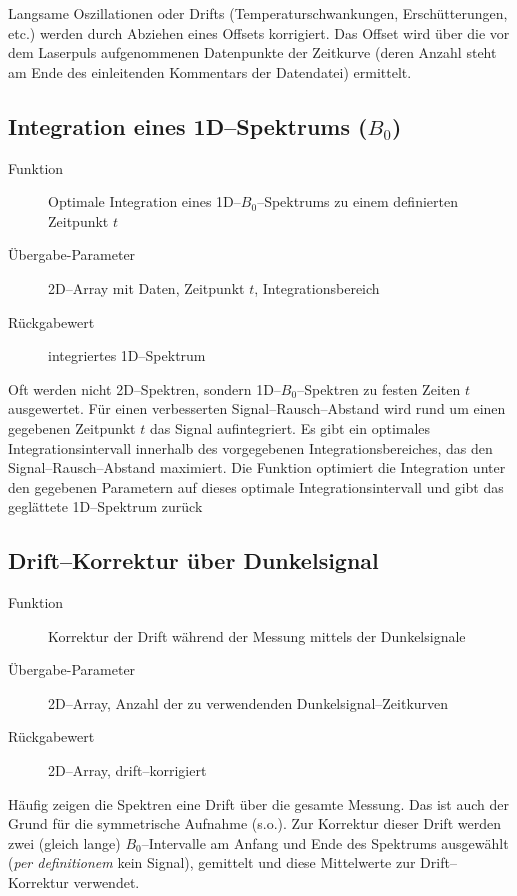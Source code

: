 \documentclass{article}
\begin{document}
Langsame Oszillationen oder Drifts (Temperaturschwankungen, Erschütterungen, etc.)
werden durch Abziehen eines Offsets korrigiert. Das Offset wird über die vor dem
Laserpuls aufgenommenen Datenpunkte der Zeitkurve (deren Anzahl steht am Ende
des einleitenden Kommentars der Datendatei) ermittelt.


\subsection{Integration eines 1D--Spektrums ($B_0$)}

\begin{description}
  \item[Funktion] Optimale Integration eines 1D--$B_0$--Spektrums zu einem
  definierten Zeitpunkt $t$
  \item[Übergabe-Parameter] 2D--Array mit Daten, Zeitpunkt $t$, Integrationsbereich
  \item[Rückgabewert] integriertes 1D--Spektrum
\end{description}

Oft werden nicht 2D--Spektren, sondern 1D--$B_0$--Spektren zu festen Zeiten $t$ 
ausgewertet. Für einen verbesserten Signal--Rausch--Abstand wird rund um einen 
gegebenen Zeitpunkt $t$ das Signal aufintegriert. Es gibt ein optimales 
Integrationsintervall innerhalb des vorgegebenen Integrationsbereiches, das den 
Signal--Rausch--Abstand maximiert. Die Funktion optimiert die Integration unter 
den gegebenen Parametern auf dieses optimale Integrationsintervall und gibt das 
geglättete 1D--Spektrum zurück


\subsection{Drift--Korrektur über Dunkelsignal}

\begin{description}
  \item[Funktion] Korrektur der Drift während der Messung mittels der Dunkelsignale
  \item[Übergabe-Parameter] 2D--Array, Anzahl der zu verwendenden 
  Dunkelsignal--Zeitkurven
  \item[Rückgabewert] 2D--Array, drift--korrigiert
\end{description}

Häufig zeigen die Spektren eine Drift über die gesamte Messung. Das ist auch der
Grund für die symmetrische Aufnahme (s.o.). Zur Korrektur dieser Drift werden
zwei (gleich lange) $B_0$--Intervalle am Anfang und Ende des Spektrums
ausgewählt (\emph{per definitionem} kein Signal), gemittelt und diese
Mittelwerte zur Drift--Korrektur verwendet.
\end{document}
